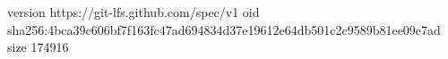 version https://git-lfs.github.com/spec/v1
oid sha256:4bca39c606bf7f163fc47ad694834d37e19612e64db501c2c9589b81ee09e7ad
size 174916
